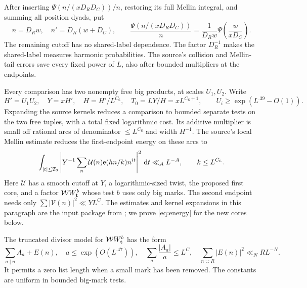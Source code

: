 After inserting $\Psi(n/(xD_RD_C))/n$, restoring its full Mellin
integral, and summing all position dyads, put
\begin{equation}\label{eq:strip}
 n=D_Rw,\quad n'=D_R(w+D_C),\qquad
 \frac{\Psi(n/(xD_RD_C))}{n}
   =\frac1{D_Rw}\Psi\left(\frac{w}{xD_C}\right).
\end{equation}
The remaining cutoff has no shared-label dependence. The factor
$D_R^{-1}$ makes the shared-label measures harmonic probabilities.
The source's collision and Mellin-tail errors save every fixed power
of $L$, also after bounded multipliers at the endpoints.

Every comparison has two nonempty free big products, at scales
$U_1,U_2$. Write
\begin{equation}\label{eq:scales}
 H'=U_1U_2,\quad Y=xH',\quad H=H'/L^{C_6},\quad
 T_0=LY/H=xL^{C_6+1},\qquad
 U_i\geq\exp(L^{.39}-O(1)).
\end{equation}
Expanding the source kernels reduces a comparison to bounded separate
tests on the two free tuples, with a total fixed logarithmic cost.
Its additive multiplier is small off rational arcs of denominator
$\leq L^{C_6}$ and width $H^{-1}$. The source's local Mellin estimate
reduces the first-endpoint energy on these arcs to
\begin{equation}\label{eq:energy}
 \int_{|t|\leq T_0}
 \left|Y^{-1}\sum_n \mathcal U(n)\mathrm e(hn/k)n^{it}\right|^2\,\mathrm d t
 \ll_A L^{-A},\qquad k\leq L^{C_6}.
\end{equation}
Here $\mathcal U$ has a smooth cutoff at $Y$, a logarithmic-sized
twist, the proposed first core, and a factor
$\mathcal W W_{\mathbf t}^{b}$ whose test $b$ uses only big marks.
The second endpoint needs only $\sum|\mathcal V(n)|^2\ll YL^C$.
The estimates and kernel expansions in this paragraph are the input
package from \cite[Section 6]{D}; we prove \eqref{eq:energy} for the
new cores below.

The truncated divisor model for $\mathcal W W_{\mathbf t}^{b}$ has the form
\begin{equation}\label{eq:divisor}
 \sum_{a\mid n}A_a+E(n),\quad
 a\leq\exp(O(L^{.47})),\quad
 \sum_a\frac{|A_a|}{a}\leq L^C,\quad
 \sum_{n\asymp R}|E(n)|^2\ll_N RL^{-N}.
\end{equation}
It permits a zero list length when a small mark has been removed.
The constants are uniform in bounded big-mark tests.

